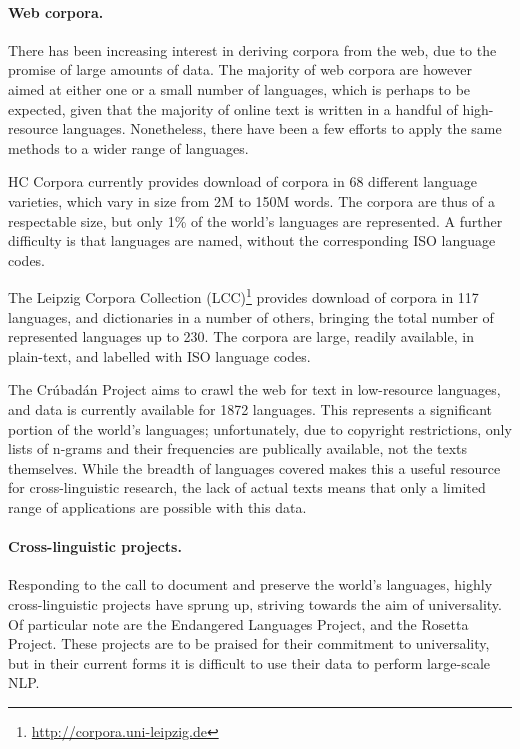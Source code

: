 \paragraph{Web corpora.}

There has been increasing interest in deriving corpora from the web, due to the promise of large amounts of data.  The majority of web corpora are however aimed at either one or a small number of languages, which is perhaps to be expected, given that the majority of online text is written in a handful of high-resource languages.  Nonetheless, there have been a few efforts to apply the same methods to a wider range of languages.

HC Corpora currently provides download of corpora in 68 different language varieties, which vary in size from 2M to 150M words. The corpora are thus of a respectable size, but only 1\% of the world's languages are represented.  A further difficulty is that languages are named, without the corresponding ISO language codes.

The Leipzig Corpora Collection (LCC)\footnote{\url{http://corpora.uni-leipzig.de}} \cite{biemann2007leipzig} provides download of corpora in 117 languages, and dictionaries in a number of others, bringing the total number of represented languages up to 230. The corpora are large, readily available, in plain-text, and labelled with ISO language codes.

The Crúbadán Project aims to crawl the web for text in low-resource languages, and data is currently available for 1872 languages.  This represents a significant portion of the world's languages; unfortunately, due to copyright restrictions, only lists of n-grams and their frequencies are publically available, not the texts themselves.  While the breadth of languages covered makes this a useful resource for cross-linguistic research, the lack of actual texts means that only a limited range of applications are possible with this data.


\paragraph{Cross-linguistic projects.}

Responding to the call to document and preserve the world's languages, highly cross-linguistic projects have sprung up, striving towards the aim of universality.  Of particular note are the Endangered Languages Project, and the Rosetta Project. These projects are to be praised for their commitment to universality, but in their current forms it is difficult to use their data to perform large-scale NLP.  

